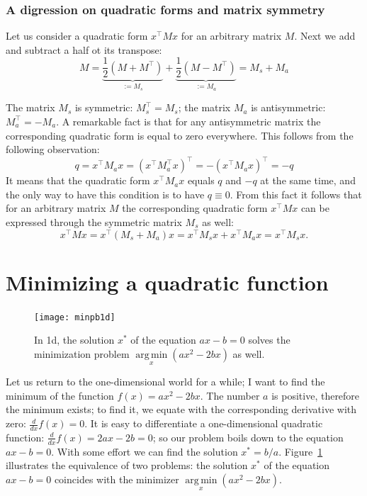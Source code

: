 \documentclass[notitlepage,oneside]{book}
\DeclareMathOperator*{\argmin}{arg\,min}
\begin{document}
\subsubsection{A digression on quadratic forms and matrix symmetry}

Let us consider a quadratic form $x^\top M x$ for an arbitrary matrix $M$. 
Next we add and subtract a half ot its transpose:
$$
M = \underbrace{\frac{1}{2} (M+M^\top)}_{:=M_s} + \underbrace{\frac{1}{2} (M-M^\top)}_{:=M_a} = M_s + M_a
$$

The matrix $M_s$ is symmetric: $M_s^\top = M_s$; the matrix $M_a$ is antisymmetric: $M_a^\top=-M_a$.
A remarkable fact is that for any antisymmetric matrix the corresponding quadratic form is equal to zero everywhere. This follows from the following observation:
$$
q = x^\top M_a x  = (x^\top M_a^\top x)^\top = - (x^\top M_a x)^\top = -q
$$
It means that the quadratic form $x^\top M_a x$ equals $q$ and $-q$ at the same time, and the only way to have this condition is to have $q\equiv 0$.
From this fact it follows that for an arbitrary matrix $M$ the corresponding quadratic form $x^\top M x$ can be expressed through the symmetric matrix $M_s$ as well:
$$
x^\top M x = x^\top (M_s + M_a) x = x^\top M_s x  + x^\top M_a x = x^\top M_s x.
$$


\section{Minimizing a quadratic function}

\begin{figure}[ht]
	\centering
	\texttt{[image: minpb1d]}
	\caption{In 1d, the solution $x^*$ of the equation $ax - b = 0$ solves the minimization problem $\argmin\limits_x(ax^2-2bx)$ as well. }
	\label{fig:min1d}
\end{figure}

Let us return to the one-dimensional world for a while; I want to find the minimum of the function $f(x) = ax^2 - 2bx$. 
The number $a$ is positive, therefore the minimum exists; to find it, we equate with the corresponding derivative with zero: $\frac{d}{dx}f(x) = 0$. 
It is easy to differentiate a one-dimensional quadratic function: $\frac{d}{dx}f(x) = 2ax - 2b = 0$; so our problem boils down to the equation $ax-b=0$.
With some effort we can find the solution $x^* = b/a$. Figure~\ref{fig:min1d} illustrates the equivalence of two problems:
the solution $x^*$ of the equation $ax-b=0$ coincides with the minimizer $\argmin\limits_x(ax^2 - 2bx)$.
\end{document}
